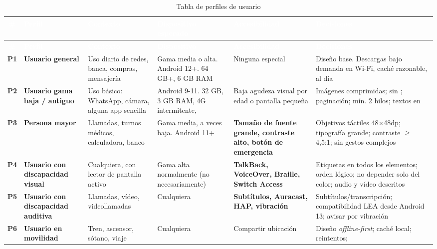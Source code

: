 {\footnotesize
\begin{xltabular}{\textwidth}{@{}c >{\RaggedRight\arraybackslash}p{2.4cm} >{\RaggedRight\arraybackslash}p{2.5cm} >{\RaggedRight\arraybackslash}p{2.7cm} >{\RaggedRight\arraybackslash}p{2.7cm} >{\RaggedRight\arraybackslash}X@{}}
\caption{Tabla de perfiles de usuario}\label{tab:perfiles}\\
\toprule
{}
\textcolor{white}{\sffamily\bfseries \#} & \textcolor{white}{\sffamily\bfseries Perfil} & \textcolor{white}{\sffamily\bfseries Contexto} & \textcolor{white}{\sffamily\bfseries Dispositivo esperado} & \textcolor{white}{\sffamily\bfseries Accesibilidad} & \textcolor{white}{\sffamily\bfseries Decisiones} \\
\midrule
\endfirsthead
\toprule
{}
\textcolor{white}{\sffamily\bfseries \#} & \textcolor{white}{\sffamily\bfseries Perfil} & \textcolor{white}{\sffamily\bfseries Contexto} & \textcolor{white}{\sffamily\bfseries Dispositivo} & \textcolor{white}{\sffamily\bfseries Accesibilidad} & \textcolor{white}{\sffamily\bfseries Decisiones} \\
\midrule
\endhead
\bottomrule
\endlastfoot
\textbf{P1} & \textbf{Usuario general} & Uso diario de redes, banca, compras, mensajería & Gama media o alta. Android 12+. 64 GB+, 6 GB RAM & Ninguna especial & Diseño base. Descargas bajo demanda en Wi-Fi, caché razonable,  al día \\
\textbf{P2} & \textbf{Usuario gama baja / antiguo} & Uso básico: WhatsApp, cámara, alguna app sencilla & Android 9-11. 32 GB, 3 GB RAM, 4G intermitente,  & Baja agudeza visual por edad o pantalla pequeña & Imágenes comprimidas; sin ; paginación; mín. 2 hilos; textos en  \\
\textbf{P3} & \textbf{Persona mayor} & Llamadas, turnos médicos, calculadora, banco & Gama media, a veces baja. Android 11+ & \textbf{Tamaño de fuente grande, contraste alto, botón de emergencia} & Objetivos táctiles 48$\times$48dp; tipografía grande; contraste $\geq$ 4,5:1; sin gestos complejos \\
\textbf{P4} & \textbf{Usuario con discapacidad visual} & Cualquiera, con lector de pantalla activo & Gama alta normalmente (no necesariamente) & \textbf{TalkBack, VoiceOver, Braille, Switch Access} & Etiquetas en todos los elementos; orden lógico; no depender solo del color; audio y vídeo descritos \\
\textbf{P5} & \textbf{Usuario con discapacidad auditiva} & Llamadas, vídeo, videollamadas & Cualquiera & \textbf{Subtítulos, Auracast, HAP, vibración} & Subtítulos/transcripción; compatibilidad LEA desde Android 13; avisar por vibración \\
\textbf{P6} & \textbf{Usuario en movilidad} & Tren, ascensor, sótano, viaje & Cualquiera & Compartir ubicación & Diseño \emph{offline-first}; caché local; reintentos;  \\
\end{xltabular}
}

